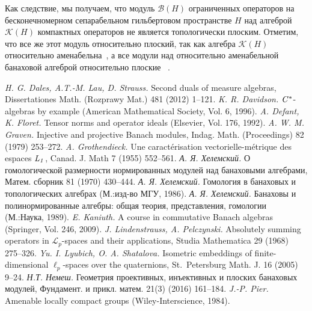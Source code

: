 \documentclass[12pt]{article}
\begin{document}
Как следствие, мы получаем, что модуль $\mathcal{B}(H)$ ограниченных операторов
на бесконечномерном сепарабельном гильбертовом пространстве $H$ над алгеброй
$\mathcal{K}(H)$ компактных операторов не является топологически плоским.
Отметим, что все же этот модуль относительно плоский, так как алгебра
$\mathcal{K}(H)$ относительно аменабельна~\cite[VII.1.89]{HelBanLocConvAlg}, а
все модули над относительно аменабельной банаховой алгеброй относительно плоские
~\cite[VII.1.60(I)]{HelBanLocConvAlg}.


\begin{thebibliography}{999}

\textit{H. G. Dales, A.T.-M. Lau, D. Strauss.} Second duals of measure algebras,
Dissertationes Math. (Rozprawy Mat.) 481 (2012) 1--121.
%
\textit{K. R. Davidson.} $\it{C^*}$-algebras by example (American Mathematical
Society, Vol. 6, 1996).
%
\textit{A. Defant, K. Floret.} Tensor norms and operator ideals (Elsevier, Vol.
176, 1992).
%
\textit{A. W. M. Graven.} Injective and projective Banach modules, Indag. Math.
(Proceedings) 82 (1979) 253--272.
%
\textit{A. Grothendieck.} Une caract{\'e}risation vectorielle-m{\'e}trique des
espaces $\it{L}_1$, Canad. J. Math 7 (1955) 552--561.
%
\textit{А. Я. Хелемский.} О гомологической размерности нормированных модулей над
банаховыми алгебрами, Матем. сборник 81 (1970) 430--444.
%
\textit{А. Я. Хелемский.} Гомология в банаховых и топологических алгебрах
(М.:изд-во МГУ, 1986).
%
\textit{А. Я. Хелемский.} Банаховы и полинормированные алгебры: общая теория,
представления, гомологии (М.:Наука, 1989).
%
\textit{E. Kaniuth.} A course in commutative Banach algebras (Springer, Vol.
246, 2009).
%
\textit{J. Lindenstrauss, A. Pelczynski.} Absolutely summing operators in
$\mathcal{L}_p$-spaces and their applications, Studia Mathematica 29 (1968)
275--326.
%
\textit{Yu. I. Lyubich, O. A. Shatalova.} Isometric embeddings of
finite-dimensional $\ell_p$-spaces over the quaternions, St.~Petersburg Math. J.
16 (2005) 9--24.
%
\textit{Н.Т. Немеш.} Геометрия проективных, инъективных и плоских банаховых
модулей, Фундамент. и прикл. матем. 21(3) (2016) 161--184.
%
\textit{J.-P. Pier.} Amenable locally compact groups (Wiley-Interscience, 1984).

\end{thebibliography}
\end{document}
